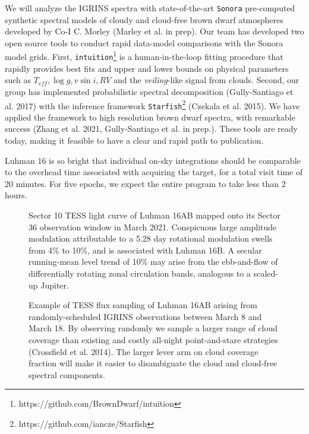 \documentclass[11pt]{article}
\begin{document}
{We will analyze the IGRINS spectra with state-of-the-art \texttt{Sonora} pre-computed synthetic spectral models of cloudy and cloud-free brown dwarf atmospheres developed by Co-I C. Morley (Marley et al. in prep).  Our team has developed two open source tools to conduct rapid data-model comparisons with the Sonora model grids. First, \texttt{intuition}\footnote{https://github.com/BrownDwarf/intuition} is a human-in-the-loop fitting procedure that rapidly provides best fits and upper and lower bounds on physical parameters such as $T_{eff}, \log{g}, v\sin{i}, RV$ and the \emph{veiling}-like signal from clouds.  Second, our group has implemented probabilistic spectral decomposition (Gully-Santiago et al. 2017) with the inference framework \texttt{Starfish}\footnote{https://github.com/iancze/Starfish} (Czekala et al. 2015).  We have applied the framework to high resolution brown dwarf spectra, with remarkable success (Zhang et al. 2021, Gully-Santiago et al. in prep.).  These tools are ready today, making it feasible to have a clear and rapid path to publication.

Luhman 16 is so bright that individual on-sky integrations should be comparable to the overhead time associated with acquiring the target, for a total visit time of 20 minutes.  For five epochs, we expect the entire program to take less than 2 hours.

\clearpage

\begin{figure}[h!]
    \caption{Sector 10 TESS light curve of Luhman 16AB mapped onto its Sector 36 observation window in March 2021.  Conspicuous large amplitude modulation attributable to a 5.28 day rotational modulation swells from 4\% to 10\%, and is associated with Luhman 16B.  A secular running-mean level trend of 10\% may arise from the ebb-and-flow of differentially rotating zonal circulation bands, analogous to a scaled-up Jupiter.}
\end{figure}

\begin{figure}[h!]
    \caption{Example of TESS flux sampling of Luhman 16AB arising from randomly-scheduled IGRINS observations between March 8 and March 18.  By observing randomly we sample a larger range of cloud coverage than existing and costly all-night point-and-stare strategies (Crossfield et al. 2014).  The larger lever arm on cloud coverage fraction will make it easier to disambiguate the cloud and cloud-free spectral components.}
\end{figure}
    

}
\end{document}
